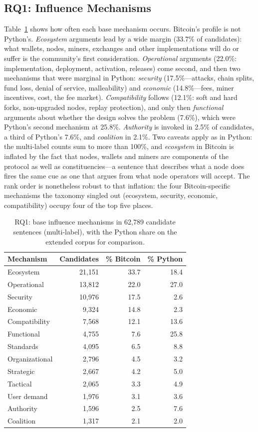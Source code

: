 \documentclass[sigconf,screen]{acmart}
\begin{document}
\subsection{RQ1: Influence Mechanisms}

Table~\ref{tab:rq1} shows how often each base mechanism occurs. Bitcoin's profile is not Python's. \emph{Ecosystem} arguments lead by a wide margin (33.7\% of candidates): what wallets, nodes, miners, exchanges and other implementations will do or suffer is the community's first consideration. \emph{Operational} arguments (22.0\%: implementation, deployment, activation, releases) come second, and then two mechanisms that were marginal in Python: \emph{security} (17.5\%---attacks, chain splits, fund loss, denial of service, malleability) and \emph{economic} (14.8\%---fees, miner incentives, cost, the fee market). \emph{Compatibility} follows (12.1\%: soft and hard forks, non-upgraded nodes, replay protection), and only then \emph{functional} arguments about whether the design solves the problem (7.6\%), which were Python's second mechanism at 25.8\%. \emph{Authority} is invoked in 2.5\% of candidates, a third of Python's 7.6\%, and \emph{coalition} in 2.1\%. Two caveats apply as in Python: the multi-label counts sum to more than 100\%, and \emph{ecosystem} in Bitcoin is inflated by the fact that nodes, wallets and miners are components of the protocol as well as constituencies---a sentence that describes what a node does fires the same cue as one that argues from what node operators will accept. The rank order is nonetheless robust to that inflation: the four Bitcoin-specific mechanisms the taxonomy singled out (ecosystem, security, economic, compatibility) occupy four of the top five places.

\begin{table}[t]
\caption{RQ1: base influence mechanisms in 62,789 candidate sentences (multi-label), with the Python share on the extended corpus for comparison.}
\label{tab:rq1}
\small
\begin{tabular}{lrrr}
\toprule
Mechanism & Candidates & \% Bitcoin & \% Python \\
\midrule
Ecosystem & 21,151 & 33.7 & 18.4 \\
Operational & 13,812 & 22.0 & 27.0 \\
Security & 10,976 & 17.5 & 2.6 \\
Economic & 9,324 & 14.8 & 2.3 \\
Compatibility & 7,568 & 12.1 & 13.6 \\
Functional & 4,755 & 7.6 & 25.8 \\
Standards & 4,095 & 6.5 & 8.8 \\
Organizational & 2,796 & 4.5 & 3.2 \\
Strategic & 2,667 & 4.2 & 5.0 \\
Tactical & 2,065 & 3.3 & 4.9 \\
User demand & 1,976 & 3.1 & 3.6 \\
Authority & 1,596 & 2.5 & 7.6 \\
Coalition & 1,317 & 2.1 & 2.0 \\
\bottomrule
\end{tabular}
\end{table}
\end{document}
